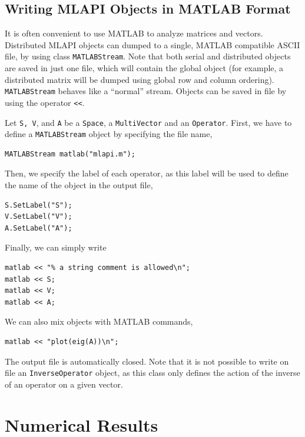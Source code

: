 \documentclass{article}[11pt]
\newcommand{\MLAPI}  {{\sc MLAPI }}
\begin{document}
\subsection{Writing \MLAPI Objects in MATLAB Format}
\label{sec:matlab}

It is often convenient to use MATLAB to analyze matrices and
vectors. Distributed \MLAPI objects can dumped to a single, MATLAB compatible
ASCII file, by using class {\tt MATLABStream}.
Note that both serial and distributed objects 
are saved in just one file, which will contain the global object
(for example, a distributed matrix will be dumped using global row and
 column ordering). {\tt MATLABStream} behaves like a ``normal'' 
stream.  Objects can be saved in file by using the operator \verb!<<!.

Let {\tt S, V}, and {\tt A} be a {\tt Space}, a {\tt MultiVector}
and an {\tt Operator}. First, we have to define a {\tt MATLABStream} object by specifying the
file name,
\begin{verbatim}
MATLABStream matlab("mlapi.m");
\end{verbatim}
Then, we specify the label of each operator, as this
label will be used to define the name of the object in the output file,
\begin{verbatim}
S.SetLabel("S");
V.SetLabel("V");
A.SetLabel("A");
\end{verbatim}
Finally, we can simply write
\begin{verbatim}
matlab << "% a string comment is allowed\n";
matlab << S;
matlab << V;
matlab << A;
\end{verbatim}
We can also mix objects with MATLAB commands,
\begin{verbatim}
matlab << "plot(eig(A))\n";
\end{verbatim}
The output file is automatically closed. Note that it is not possible to write
on file an {\tt InverseOperator} object, as this class only defines the
action of the inverse of an operator on a given vector.

\section{Numerical Results}
\label{sec:results}
\end{document}
